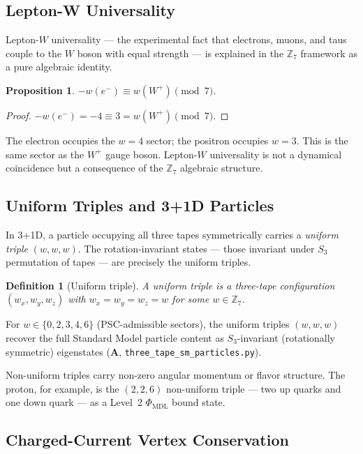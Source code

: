\documentclass[11pt]{article}
\newtheorem{proposition}[theorem]{Proposition}
\newtheorem{definition}[theorem]{Definition}
\theoremstyle{remark}
\newcommand{\PHIMDL}{\Phi_{\mathrm{MDL}}}
\newcommand{\ZS}{\mathbb{Z}_7}
\newcommand{\CatA}{\textbf{A}}
\begin{document}
\subsection{Lepton-W Universality}

Lepton-$W$ universality — the experimental fact that electrons, muons, and
taus couple to the $W$ boson with equal strength — is explained in the
$\ZS$ framework as a pure algebraic identity.

\begin{proposition}
$-w(e^-) \equiv w(W^+) \pmod{7}$.
\end{proposition}
\begin{proof}
$-w(e^-) = -4 \equiv 3 = w(W^+) \pmod{7}$. \qedhere
\end{proof}
The electron occupies the $w = 4$ sector; the positron occupies $w = 3$.
This is the same sector as the $W^+$ gauge boson. Lepton-$W$ universality
is not a dynamical coincidence but a consequence of the $\ZS$ algebraic
structure.

\subsection{Uniform Triples and 3+1D Particles}

In 3+1D, a particle occupying all three tapes symmetrically carries a
\emph{uniform triple} $(w,w,w)$. The rotation-invariant states — those
invariant under $S_3$ permutation of tapes — are precisely the uniform
triples.

\begin{definition}[Uniform triple]
A \emph{uniform triple} is a three-tape configuration $(w_x, w_y, w_z)$
with $w_x = w_y = w_z = w$ for some $w \in \ZS$.
\end{definition}

For $w \in \{0, 2, 3, 4, 6\}$ (PSC-admissible sectors), the uniform
triples $(w,w,w)$ recover the full Standard Model particle content
as $S_3$-invariant (rotationally symmetric) eigenstates ($\CatA$,
\texttt{three\_tape\_sm\_particles.py}).

Non-uniform triples carry non-zero angular momentum or flavor structure.
The proton, for example, is the $(2,2,6)$ non-uniform triple — two up quarks
and one down quark — as a Level~2 $\PHIMDL$ bound state.

\subsection{Charged-Current Vertex Conservation}
\end{document}
